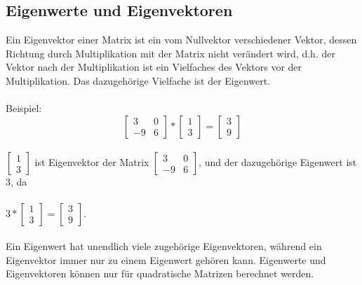 \documentclass[11pt]{scrreprt}
\begin{document}
\subsection{Eigenwerte und Eigenvektoren}
 Ein Eigenvektor einer Matrix ist ein vom Nullvektor verschiedener Vektor, dessen Richtung durch Multiplikation mit der Matrix nicht verändert wird, d.h. der Vektor nach der Multiplikation ist ein Vielfaches des Vektors vor der Multiplikation. Das dazugehörige Vielfache ist der Eigenwert.\\
\\
Beispiel:
\begin{equation}
\begin{bmatrix}
3  & 0\\
-9 & 6 
\end {bmatrix}
*
\begin{bmatrix}
1 \\ 
3  
\end {bmatrix}
=
\begin{bmatrix}
3 \\
9  
\end {bmatrix}
\end{equation}
\\
$\begin{bmatrix}
1 \\ 
3  
\end {bmatrix}$ ist Eigenvektor der Matrix $\begin{bmatrix}
3  & 0 \\
-9 & 6 
\end {bmatrix}$, und der dazugehörige Eigenwert ist 3, da \\
\\
$3*\begin{bmatrix}
1 \\ 
3  
\end {bmatrix} 
=
\begin{bmatrix}
3  \\
9  
\end {bmatrix}
$.\\
\\
Ein Eigenwert hat unendlich viele zugehörige Eigenvektoren, während ein Eigenvektor immer nur zu einem Eigenwert gehören kann. Eigenwerte und Eigenvektoren können nur für quadratische Matrizen berechnet werden.
\end{document}

